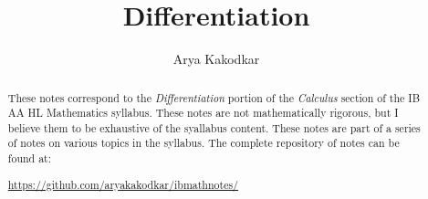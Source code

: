 \documentclass[a4paper]{report}
\author{Arya Kakodkar}
\title{Differentiation}
\begin{document}
\maketitle

\begin{abstract}
	These notes correspond to the \textit{Differentiation} portion of the \textit{Calculus}
	section of the IB AA HL Mathematics syllabus. These notes are not mathematically rigorous, but I believe them 
	to be exhaustive of the syallabus content. These notes are part of a series of notes on various topics in the syllabus.
	The complete repository of notes can be found at: 
	\begin{center}
		\url{https://github.com/aryakakodkar/ibmathnotes/}
	\end{center}
\end{abstract}

\newpage

\tableofcontents


\end{document}
